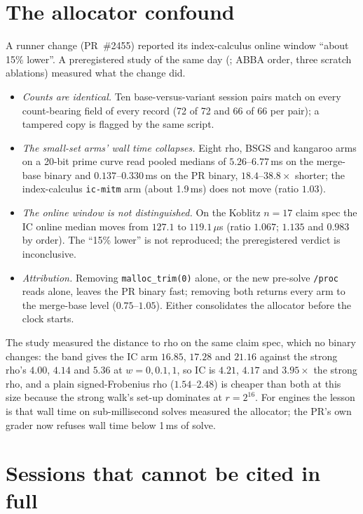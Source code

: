 \section{The allocator confound}\label{sec:em-allocator}

A runner change (PR~\#2455) reported its index-calculus online window
``about 15\% lower''. A preregistered study of the same day
(; ABBA order,
three scratch ablations) measured what the change did.
\begin{itemize}
\item \emph{Counts are identical.} Ten base-versus-variant session pairs
  match on every count-bearing field of every record (72 of 72 and 66 of 66
  per pair); a tampered copy is flagged by the same script.
\item \emph{The small-set arms' wall time collapses.} Eight rho, BSGS and
  kangaroo arms on a 20-bit prime curve read pooled medians of
  $5.26$--$6.77$\,ms on the merge-base binary and $0.137$--$0.330$\,ms on
  the PR binary, $18.4$--$38.8\times$ shorter; the index-calculus
  \texttt{ic-mitm} arm (about 1.9\,ms) does not move (ratio $1.03$).
\item \emph{The online window is not distinguished.} On the Koblitz $n=17$
  claim spec the IC online median moves from $127.1$ to $119.1\,\mu$s
  (ratio $1.067$; $1.135$ and $0.983$ by order). The ``15\% lower'' is not
  reproduced; the preregistered verdict is inconclusive.
\item \emph{Attribution.} Removing \texttt{malloc\_trim(0)} alone, or the
  new pre-solve \texttt{/proc} reads alone, leaves the PR binary fast;
  removing both returns every arm to the merge-base level ($0.75$--$1.05$).
  Either consolidates the allocator before the clock starts.
\end{itemize}
The study measured the distance to rho on the same claim spec, which no
binary changes: the band gives the IC arm $16.85$, $17.28$ and $21.16$
against the strong rho's $4.00$, $4.14$ and $5.36$ at $w=0,0.1,1$, so IC is
$4.21$, $4.17$ and $3.95\times$ the strong rho, and a plain signed-Frobenius
rho ($1.54$--$2.48$) is cheaper than both at this size because the strong
walk's set-up dominates at $r=2^{16}$. For engines the lesson is that wall
time on sub-millisecond solves measured the allocator; the PR's own grader
now refuses wall time below 1\,ms of solve.

\section{Sessions that cannot be cited in full}\label{sec:em-registries}

